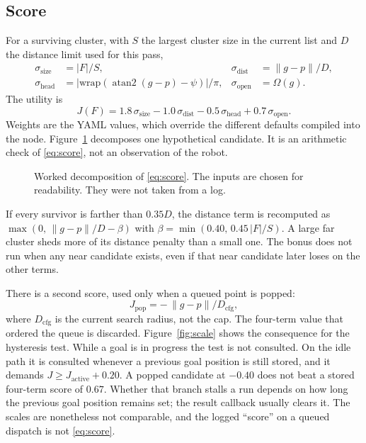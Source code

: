 \documentclass[11pt]{article}
\begin{document}
\subsection{Score}
For a surviving cluster, with $S$ the largest cluster size in the current list and $D$ the distance limit used for this pass,
\begin{align}
\sigma_{\mathrm{size}} &= |F|/S, &
\sigma_{\mathrm{dist}} &= \|g-p\|/D, \nonumber\\
\sigma_{\mathrm{head}} &= |\mathrm{wrap}(\operatorname{atan2}(g-p)-\psi)|/\pi, &
\sigma_{\mathrm{open}} &= \Omega(g).
\label{eq:terms}
\end{align}
The utility is
\begin{equation}
J(F)= 1.8\,\sigma_{\mathrm{size}} - 1.0\,\sigma_{\mathrm{dist}} - 0.5\,\sigma_{\mathrm{head}} + 0.7\,\sigma_{\mathrm{open}}.
\label{eq:score}
\end{equation}
Weights are the YAML values, which override the different defaults compiled into the node. Figure~\ref{fig:score} decomposes one hypothetical candidate. It is an arithmetic check of \eqref{eq:score}, not an observation of the robot.

\begin{figure}[ht]
\centering
\FigScore
\caption{Worked decomposition of \eqref{eq:score}. The inputs are chosen for readability. They were not taken from a log.}
\label{fig:score}
\end{figure}

If every survivor is farther than $0.35D$, the distance term is recomputed as $\max(0,\,\|g-p\|/D - \beta)$ with $\beta=\min(0.40,\,0.45\,|F|/S)$. A large far cluster sheds more of its distance penalty than a small one. The bonus does not run when any near candidate exists, even if that near candidate later loses on the other terms.

There is a second score, used only when a queued point is popped:
\begin{equation}
J_{\mathrm{pop}}= -\,\|g-p\|/D_{\mathrm{cfg}},
\label{eq:pop}
\end{equation}
where $D_{\mathrm{cfg}}$ is the current search radius, not the cap. The four-term value that ordered the queue is discarded. Figure~\ref{fig:scale} shows the consequence for the hysteresis test. While a goal is in progress the test is not consulted. On the idle path it is consulted whenever a previous goal position is still stored, and it demands $J \ge J_{\mathrm{active}}+0.20$. A popped candidate at $-0.40$ does not beat a stored four-term score of $0.67$. Whether that branch stalls a run depends on how long the previous goal position remains set; the result callback usually clears it. The scales are nonetheless not comparable, and the logged ``score'' on a queued dispatch is not \eqref{eq:score}.
\end{document}
